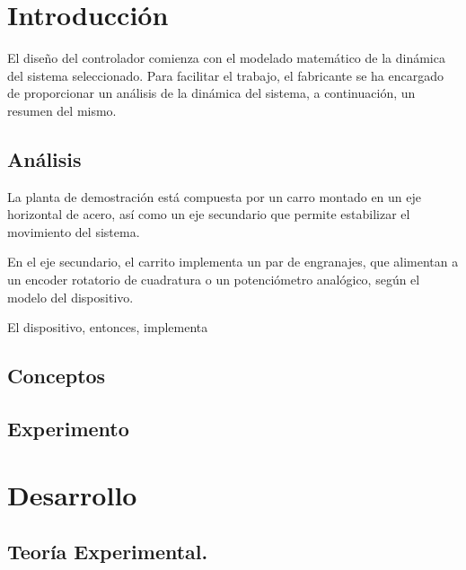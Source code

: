 \documentclass[12pt,a4paper]{article}
\begin{document}
	
    \tableofcontents
	
	\pagebreak
	
	  \section{Introducción} \label{sec:intro}
	
      El diseño del controlador comienza con el modelado matemático de la dinámica del sistema seleccionado. Para 
      facilitar el trabajo, el fabricante se ha encargado de proporcionar un análisis de la dinámica del sistema, 
      a continuación, un resumen del mismo. 

      \subsection{Análisis}

        La planta de demostración está compuesta por un carro montado en un eje horizontal de acero, así como un 
        eje secundario que permite estabilizar el movimiento del sistema.

        En el eje secundario, el carrito implementa un par de engranajes, que alimentan a un encoder rotatorio de 
        cuadratura o un potenciómetro analógico, según el modelo del dispositivo. 

        El dispositivo, entonces, implementa

	    \subsection{Conceptos}
	
	    \subsection{Experimento} \label{subsec: EXP}
	
	\pagebreak
	
	\section{Desarrollo}
	
	\subsection{Teoría Experimental.}
	
\end{document}
